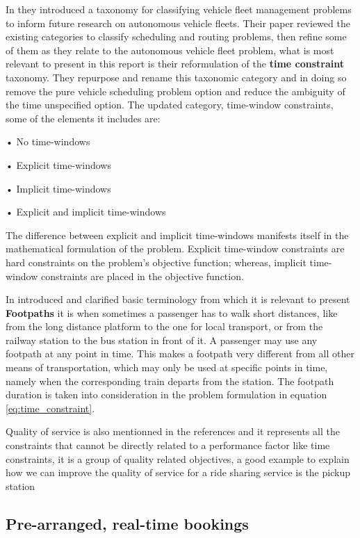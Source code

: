 \documentclass{article}
\begin{document}
In \cite{hyland_taxonomy} they introduced a taxonomy for classifying vehicle fleet management problems to inform future research on autonomous vehicle fleets. Their paper reviewed the
existing categories to classify scheduling and routing problems, then refine some of them as they relate to the autonomous vehicle fleet problem, what is most relevant to present in this report is their reformulation of the \textbf{time constraint} taxonomy.
They repurpose and rename this taxonomic category and in doing so remove the pure vehicle scheduling problem option and reduce the ambiguity of the time unspecified option. 
The updated  category, time-window constraints, some of the elements it includes are: 
\begin{list}{}{}
\item • No time-windows
\item • Explicit time-windows
\item • Implicit time-windows
\item • Explicit and implicit time-windows
\end{list}

The difference  between explicit and implicit time-windows manifests itself in the mathematical formulation of the problem. Explicit time-window constraints are hard constraints on the problem’s objective function; whereas, implicit time-window constraints are placed in the objective function.
 

In \cite{Schnee2009} introduced and clarified basic terminology from which it is relevant to present \textbf{Footpaths} it is when sometimes a passenger has to walk short distances, like from the long distance
platform to the one for local transport, or from the railway station to the bus station in front of it. A passenger may use any footpath at any point in time. This makes a footpath very different
from all other means of transportation, which may only be used at specific points in time, namely when the corresponding train departs from the station. The footpath duration is taken into consideration in the problem formulation in equation \ref{eq:time_constraint}.


Quality of service is also mentionned in the references and it represents all the constraints that cannot be directly related to a performance factor like time constraints, it is a group of quality related objectives, a good example to explain how we can improve the quality of service for a ride sharing service is the pickup station 


\subsection{Pre-arranged, real-time bookings}
\end{document}

